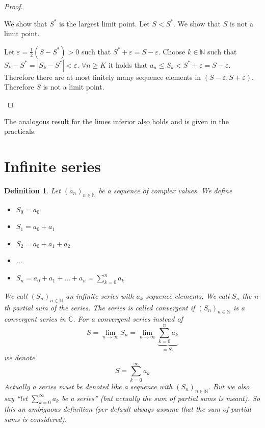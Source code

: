 \documentclass[a4paper,landscape,twocolumn]{article}
\newtheorem{defi}{Definition}
\newcommand\abs[1]{\left|#1\right|}
\newcommand\seq[1]{{\left(#1\right)}_{n \in \mathbb N}}
\begin{document}
\begin{proof}
\begin{description}
      We show that $S^*$ is the largest limit point.
      Let $S < S^*$. We show that $S$ is not a limit point.

      Let $\varepsilon = \frac12(S - S^*) > 0$ such that $S^* + \varepsilon = S - \varepsilon$.
      Choose $k \in \mathbb N$ such that $S_k - S^* = \abs{S_k - S^*} < \varepsilon$.
      $\forall n \geq K$ it holds that $a_n \leq S_k < S^* + \varepsilon = S - \varepsilon$.
      Therefore there are at most finitely many sequence elements in $(S - \varepsilon, S + \varepsilon)$.
      Therefore $S$ is not a limit point.
  \end{description}
\end{proof}

The analogous result for the limes inferior also holds and is given in the practicals.

\section{Infinite series}
\begin{defi}
  Let $\seq{a_n}$ be a sequence of complex values. We define
  \begin{itemize}
    \item $S_0 = a_0$
    \item $S_1 = a_0 + a_1$
    \item $S_2 = a_0 + a_1 + a_2$
    \item $\dots$
    \item $S_n = a_0 + a_1 + \dots + a_n = \sum_{k=0}^n a_k$
  \end{itemize}
  We call $\seq{S_n}$ an \emph{infinite series} with $a_k$ sequence elements.
  We call $S_n$ the \emph{n-th partial sum} of the series.
  The series is called \emph{convergent} if $\seq{S_n}$ is a convergent series in $\mathbb C$.
  For a convergent series instead of
  \[ S = \lim_{n\to\infty} S_n = \lim_{n\to\infty} \underbrace{\sum_{k=0}^n a_k}_{= S_n} \]
  we denote
  \[ S = \sum_{k = 0}^\infty a_k \]
  Actually a series must be denoted like a sequence with $\seq{S_n}$.
  But we also say \enquote{let $\sum_{k=0}^\infty a_k$ be a series}
  (but actually the sum of partial sums is meant).
  So this an ambiguous definition (per default always assume that the sum of partial sums is considered).
\end{defi}
\end{document}
